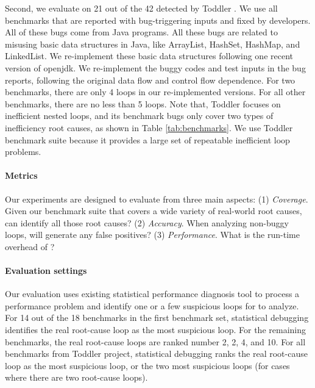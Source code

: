 Second, we evaluate \Tool on 21 out of the 42 detected by Toddler \cite{Alabama, toddlerbuglist}.
{\color{red} We use all benchmarks that are reported with bug-triggering inputs and fixed by developers. 
All of these bugs come from Java programs. 
All these bugs are related to misusing basic data structures in Java, like ArrayList, HashSet, HashMap, and LinkedList. 
We re-implement these basic data structures following one recent version of openjdk. 
We re-implement the buggy codes and test inputs in the bug reports, 
following the original data flow and control flow dependence. 
For two benchmarks, there are only 4 loops in our re-implemented versions. 
For all other benchmarks, there are no less than 5 loops.} 
Note that, Toddler focuses on inefficient nested loops, and its
benchmark bugs only cover two types of inefficiency root causes,
as shown in Table \ref{tab:benchmarks}.
We use Toddler benchmark suite because it provides a large set of
repeatable inefficient loop problems. 


\paragraph{Metrics}
Our experiments are designed to evaluate \Tool from three main aspects:
(1) 
\textit{Coverage}. Given our benchmark suite that covers a wide variety
of real-world root causes, can \Tool identify all those root causes?
(2)
\textit{Accuracy}. 
When analyzing non-buggy loops, will \Tool generate any false positives?
(3) 
\textit{Performance}.
What is the run-time overhead of \Tool?

\paragraph{Evaluation settings}
Our evaluation uses existing statistical performance diagnosis
tool \cite{SongOOPSLA2014} to process a performance problem and identify 
one or a few suspicious loops for \Tool to analyze.
For 14 out of the 18 benchmarks {\color{red} in the first benchmark set}, statistical debugging identifies the
real root-cause loop as the most suspicious loop. For the remaining
benchmarks, the real root-cause loops are ranked number 2, 2, 4, and 10.
{\color{red} For all benchmarks from Toddler project, 
statistical debugging ranks the real root-cause loop as the most suspicious loop, 
or the two most suspicious loops (for cases where there are two root-cause loops). }

